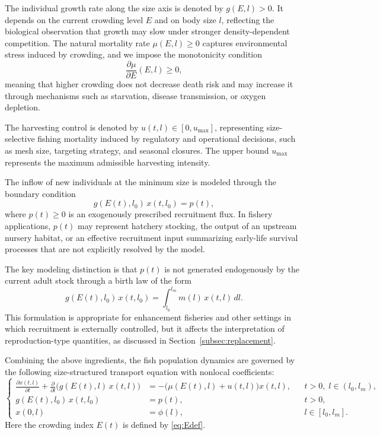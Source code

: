 \documentclass[pdflatex,sn-mathphys-num]{sn-jnl}
\theoremstyle{thmstyleone}
\theoremstyle{definition}
\theoremstyle{remark}
\begin{document}
The individual growth rate along the size axis is denoted by $g(E,l)>0$. It
depends on the current crowding level $E$ and on body size $l$, 
reflecting the
biological observation that growth may slow under stronger density-dependent
competition. The natural mortality rate $\mu(E,l)\ge 0$ captures environmental
stress induced by crowding, and we impose the monotonicity condition
\begin{equation}\label{eq:mumono}
\frac{\partial \mu}{\partial E}(E,l)\ge 0,
\end{equation}
meaning that higher crowding does not decrease death risk and may increase it
through mechanisms such as starvation, disease transmission, or oxygen
depletion.

The harvesting control is denoted by $u(t,l)\in[0,u_{\max}]$, representing
size-selective fishing mortality induced by regulatory and operational
decisions, such as mesh size, targeting strategy, and seasonal closures. The
upper bound $u_{\max}$ represents the maximum admissible harvesting intensity.

The inflow of new individuals at the minimum size is modeled through the
boundary condition
\begin{equation}\label{eq:model_bc}
g(E(t),l_0)\,x(t,l_0)=p(t),
\end{equation}
where $p(t)\ge 0$ is an exogenously prescribed recruitment flux. In
fishery applications, $p(t)$ may represent hatchery stocking, the output of
an upstream nursery habitat, or an effective recruitment input summarizing
early-life survival processes that are not explicitly resolved by the model.

The key modeling distinction is that $p(t)$ is not generated
endogenously by the current adult stock through a birth law of the form
\[
g(E(t),l_0)\,x(t,l_0)=\int_{l_0}^{l_m} m(l)\,x(t,l)\,dl.
\]
This formulation is appropriate for enhancement fisheries and other settings in
which recruitment is externally controlled, but it affects the interpretation
of reproduction-type quantities, as discussed in
Section~\ref{subsec:replacement}.

Combining the above ingredients, 
the fish population dynamics are
governed by the following size-structured transport equation with nonlocal
coefficients:
\begin{equation}\label{eq:fish_model}
\left\{
\begin{aligned}
\frac{\partial x(t,l)}{\partial t}
+\frac{\partial}{\partial l}\!\Big(g(E(t),l)\,x(t,l)\Big)
&= -\Big(\mu(E(t),l)+u(t,l)\Big)x(t,l),
&& t>0,\; l\in(l_0,l_m), \\[4pt]
g(E(t),l_0)\,x(t,l_0) &= p(t),
&& t>0, \\[4pt]
x(0,l) &= \phi(l),
&& l\in[l_0,l_m].
\end{aligned}
\right.
\end{equation}
Here the crowding index $E(t)$ is defined by \eqref{eq:Edef}.
\end{document}
